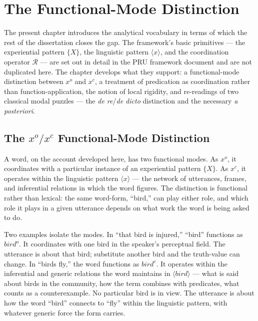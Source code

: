\documentclass[12pt,a4paper]{article}
\begin{document}
\section{The Functional-Mode Distinction}\label{the-functional-mode-distinction}

The present chapter introduces the analytical vocabulary in terms of which the rest of the dissertation closes the gap. The framework's basic primitives --- the experiential pattern \(\{X\}\), the linguistic pattern \(\langle x \rangle\), and the coordination operator \(\mathcal{R}\) --- are set out in detail in the PRU framework document and are not duplicated here. The chapter develops what they support: a functional-mode distinction between \(x^o\) and \(x^c\), a treatment of predication as coordination rather than function-application, the notion of local rigidity, and re-readings of two classical modal puzzles --- the \emph{de re}/\emph{de dicto} distinction and the necessary \emph{a posteriori}.

\subsection{\texorpdfstring{The \(x^o/x^c\) Functional-Mode Distinction}{The x\^{}o/x\^{}c Functional-Mode Distinction}}\label{the-xoxc-functional-mode-distinction}

A word, on the account developed here, has two functional modes. As \(x^o\), it coordinates with a particular instance of an experiential pattern \(\{X\}\). As \(x^c\), it operates within the linguistic pattern \(\langle x \rangle\) --- the network of utterances, frames, and inferential relations in which the word figures. The distinction is functional rather than lexical: the same word-form, ``bird,'' can play either role, and which role it plays in a given utterance depends on what work the word is being asked to do.

Two examples isolate the modes. In ``that bird is injured,'' ``bird'' functions as \(bird^o\). It coordinates with one bird in the speaker's perceptual field. The utterance is about that bird; substitute another bird and the truth-value can change. In ``birds fly,'' the word functions as \(bird^c\). It operates within the inferential and generic relations the word maintains in \(\langle bird \rangle\) --- what is said about birds in the community, how the term combines with predicates, what counts as a counterexample. No particular bird is in view. The utterance is about how the word ``bird'' connects to ``fly'' within the linguistic pattern, with whatever generic force the form carries.
\end{document}
